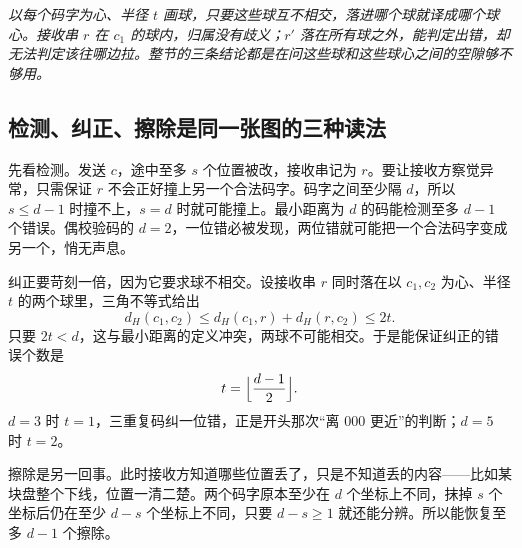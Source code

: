 \begin{center}

\emph{以每个码字为心、半径 \(t\) 画球，只要这些球互不相交，落进哪个球就译成哪个球心。接收串 \(r\) 在 \(c_1\) 的球内，归属没有歧义；\(r'\) 落在所有球之外，能判定出错，却无法判定该往哪边拉。整节的三条结论都是在问这些球和这些球心之间的空隙够不够用。}
\end{center}

\subsection{检测、纠正、擦除是同一张图的三种读法}

先看检测。发送 \(c\)，途中至多 \(s\) 个位置被改，接收串记为 \(r\)。要让接收方察觉异常，只需保证 \(r\) 不会正好撞上另一个合法码字。码字之间至少隔 \(d\)，所以 \(s\le d-1\) 时撞不上，\(s=d\) 时就可能撞上。最小距离为 \(d\) 的码能检测至多 \(d-1\) 个错误。偶校验码的 \(d=2\)，一位错必被发现，两位错就可能把一个合法码字变成另一个，悄无声息。

纠正要苛刻一倍，因为它要求球不相交。设接收串 \(r\) 同时落在以 \(c_1,c_2\) 为心、半径 \(t\) 的两个球里，三角不等式给出
\[
d_H(c_1,c_2)\le d_H(c_1,r)+d_H(r,c_2)\le 2t .
\]
只要 \(2t<d\)，这与最小距离的定义冲突，两球不可能相交。于是能保证纠正的错误个数是
\[
t=\Bigl\lfloor\frac{d-1}{2}\Bigr\rfloor .
\]
\(d=3\) 时 \(t=1\)，三重复码纠一位错，正是开头那次``离 \(000\) 更近''的判断；\(d=5\) 时 \(t=2\)。

擦除是另一回事。此时接收方知道哪些位置丢了，只是不知道丢的内容——比如某块盘整个下线，位置一清二楚。两个码字原本至少在 \(d\) 个坐标上不同，抹掉 \(s\) 个坐标后仍在至少 \(d-s\) 个坐标上不同，只要 \(d-s\ge1\) 就还能分辨。所以能恢复至多 \(d-1\) 个擦除。

